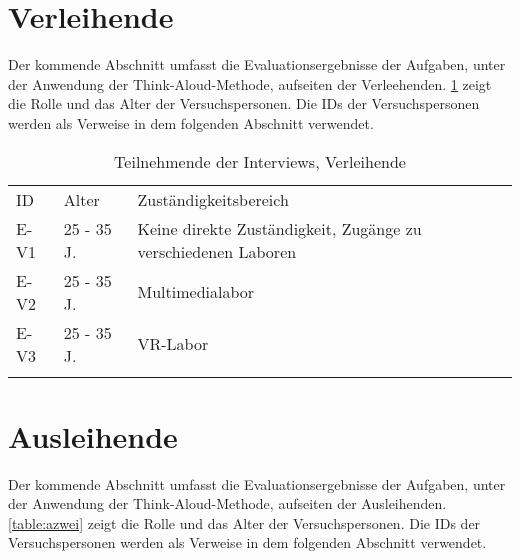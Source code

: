 \section{Verleihende}
Der kommende Abschnitt umfasst die Evaluationsergebnisse der Aufgaben, unter der Anwendung der
Think-Aloud-Methode, aufseiten der Verleehenden. \ref{table:vzwei} zeigt die Rolle und das Alter der
Versuchspersonen. Die IDs der Versuchspersonen werden als Verweise in dem folgenden Abschnitt
verwendet.


\begin{table}[h]
  \centering
  \caption{Teilnehmende der Interviews, Verleihende}
  \begin{tabular}{lll}
    \arrayrulecolor{maincolor}\hline
    \sffamily\color{maincolor}ID & \sffamily\color{maincolor}Alter &
    \sffamily\color{maincolor}Zuständigkeitsbereich
    \\
    \arrayrulecolor{maincolor}\hline
    E-V1                         & 25 - 35 J.                      & Keine
    direkte Zuständigkeit, Zugänge zu verschiedenen Laboren
    \\
    E-V2                         & 25 - 35 J.                      &
    Multimedialabor                                                           \\
    E-V3                         & 25 - 35 J.                      & VR-Labor \\
    \arrayrulecolor{maincolor}\hline
  \end{tabular}
  \label{table:vzwei}
\end{table}



\section{Ausleihende}

Der kommende Abschnitt umfasst die Evaluationsergebnisse der Aufgaben, unter der Anwendung der
Think-Aloud-Methode, aufseiten der Ausleihenden. \ref{table:azwei} zeigt die Rolle und das Alter der
Versuchspersonen. Die IDs der Versuchspersonen werden als Verweise in dem folgenden Abschnitt
verwendet.

